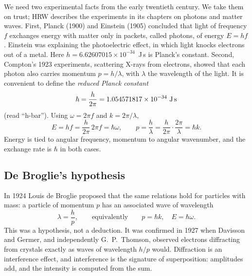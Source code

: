 We need two experimental facts from the early twentieth century. We take them on trust; HRW \cite{hrw} describes the experiments in its chapters on photons and matter waves. First, Planck (1900) and Einstein (1905) concluded that light of frequency $f$ exchanges energy with matter only in packets, called photons, of energy $E=hf$. Einstein was explaining the photoelectric effect, in which light knocks electrons out of a metal. Here $h=6.62607015\times10^{-34}$~J\,s is Planck's constant. Second, Compton's 1923 experiments, scattering X-rays from electrons, showed that each photon also carries momentum $p=h/\lambda$, with $\lambda$ the wavelength of the light. It is convenient to define the \emph{reduced Planck constant}
\begin{equation}
\hbar=\frac{h}{2\pi}=1.054571817\times10^{-34}\ \text{J\,s}
\end{equation}
(read ``h-bar''). Using $\omega=2\pi f$ and $k=2\pi/\lambda$,
\begin{equation}
E=hf=\frac{h}{2\pi}\,2\pi f=\hbar\omega,\qquad
p=\frac{h}{\lambda}=\frac{h}{2\pi}\cdot\frac{2\pi}{\lambda}=\hbar k.
\label{eq:schrodinger-planck}
\end{equation}
Energy is tied to angular frequency, momentum to angular wavenumber, and the exchange rate is $\hbar$ in both cases.

\subsection{De Broglie's hypothesis}

In 1924 Louis de Broglie proposed that the same relations hold for particles with mass: a particle of momentum $p$ has an associated wave of wavelength
\begin{equation}
\lambda=\frac{h}{p},\qquad\text{equivalently}\qquad p=\hbar k,\quad E=\hbar\omega.
\label{eq:schrodinger-debroglie}
\end{equation}
This was a hypothesis, not a deduction. It was confirmed in 1927 when Davisson and Germer, and independently G.~P.~Thomson, observed electrons diffracting from crystals exactly as waves of wavelength $h/p$ would. Diffraction is an interference effect, and interference is the signature of superposition: amplitudes add, and the intensity is computed from the sum.

